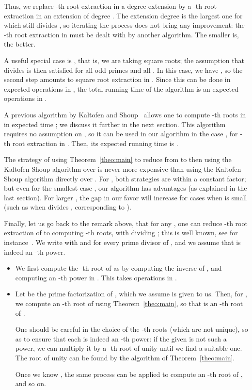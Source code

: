 \documentclass[12pt]{article}
\theoremstyle{plain}
\theoremstyle{definition}
\newcounter{algorithm}
\begin{document}
Thus, we replace -th root extraction in a degree  extension by a
-th root extraction in an extension of degree .
The extension degree  is the largest one for which  still
divides , so iterating the process does not bring any
improvement: the -th root extraction in  must be dealt
with by another algorithm. The smaller  is, the better.

A useful special case is , that is, we are taking square roots;
the assumption that  divides  is then satisfied for all odd
primes  and all . In this case, we have , so the second
step amounts to square root extraction in . Since this can be
done in  expected operations in , the total running
time of the algorithm is an expected 
operations in . 

A previous algorithm by Kaltofen and Shoup~\cite{KaltofenShoup1997}
allows one to compute -th roots in  in expected time
; we discuss
it further in the next section. This algorithm requires no assumption
on , so it can be used in our algorithm in the case , for
-th root extraction in . Then, its expected running time
is .

The strategy of using Theorem~\ref{theo:main} to reduce from  to
 then using the Kaltofen-Shoup algorithm over 
is never more expensive than using the Kaltofen-Shoup algorithm
directly over . For , both strategies are within a
constant factor; but even for the smallest case , our algorithm
has advantages (as explained in the last section). For larger , the
gap in our favor will increase for cases when  is small (such 
as when  divides , corresponding to ).

\medskip

Finally, let us go back to the remark above, that for any , one can
reduce -th root extraction of  to computing -th
roots, with  dividing ; this is well known, see for
instance~\cite[Chapter~7.3]{BachSh1996}. We write  with  and  for every prime divisor  of , and
we assume that  is indeed an -th power.
\begin{itemize}
\item We first compute the -th root  of  as
   by computing the inverse  of
  , and computing an -th power in . This
  takes  operations in .
\item Let  be the prime
  factorization of , which we assume is given to us. Then, for , we compute an -th root  of 
  using Theorem~\ref{theo:main}, so that  is an
  -th root of .

  One should be careful in the choice of the -th roots (which are
  not unique), so as to ensure that each  is indeed an
  -th power: if the given  is not such a power, we can
  multiply it by a -th root of unity until we find a suitable
  one.  The root of unity can be found by the algorithm of
  Theorem~\ref{theo:main}.

  Once we know , the same process can be applied to
  compute an -th root of , and so on.
\end{itemize}
\end{document}
